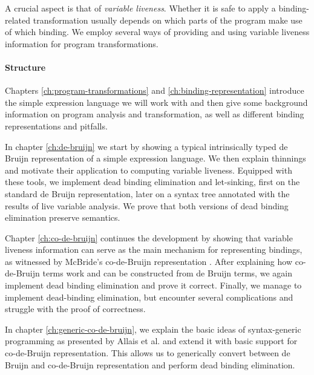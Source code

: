     A crucial aspect is that of \emph{variable liveness}.
    Whether it is safe to apply a binding-related transformation
    usually depends on which parts of the program make use of which binding.
    We employ several ways of providing and using variable liveness information
    for program transformations.

  \paragraph{Structure}
    Chapters \ref{ch:program-transformations} and \ref{ch:binding-representation}
    introduce the simple expression language we will work with
    and then give some background information on program analysis and transformation,
    as well as different binding representations and pitfalls.

    In chapter \ref{ch:de-bruijn} we start by
    showing a typical intrinsically typed de Bruijn representation of a simple expression language.
    We then explain thinnings and motivate their application to computing variable liveness.
    Equipped with these tools,
    we implement dead binding elimination and let-sinking,
    first on the standard de Bruijn representation,
    later on a syntax tree annotated with the results of live variable analysis.
    We prove that both versions of dead binding elimination preserve semantics.

    Chapter \ref{ch:co-de-bruijn} continues the development by showing that variable liveness information
    can serve as the main mechanism for representing bindings, as witnessed by
    McBride's co-de-Bruijn representation
    \cite{McBride2018EveryBodysGotToBeSomewhere}.
    After explaining how co-de-Bruijn terms work and can be constructed from de Bruijn terms,
    we again implement dead binding elimination and prove it correct.
    Finally, we manage to implement dead-binding elimination, but encounter several complications
    and struggle with the proof of correctness.

    In chapter \ref{ch:generic-co-de-bruijn}, we explain the basic ideas of syntax-generic programming
    as presented by Allais et al.
    \cite{Allais2018UniverseOfSyntaxes}
    and extend it with basic support for co-de-Bruijn representation.
    This allows us to generically convert between de Bruijn and co-de-Bruijn representation
    and perform dead binding elimination.


